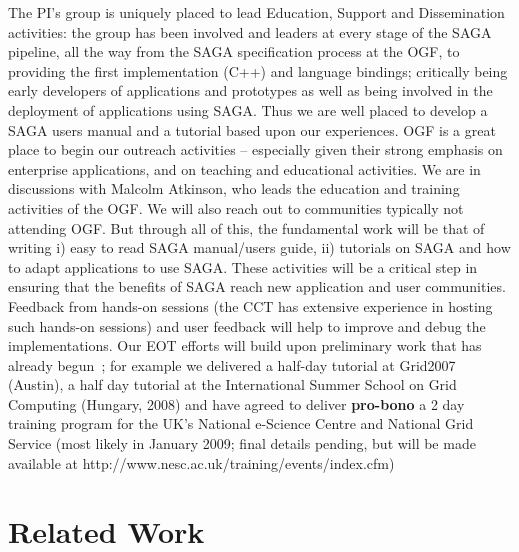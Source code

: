 \documentclass[10pt,letterpaper]{article}
\begin{document}
The PI's group is uniquely placed to lead Education, Support and
Dissemination activities: the group has been involved and leaders at
every stage of the SAGA pipeline, all the way from the SAGA
specification process at the OGF, to providing the first
implementation (C++) and language bindings; critically being early
developers of applications and prototypes as well as being involved
in the deployment of applications using SAGA.  Thus we are well placed
to develop a SAGA users manual and a tutorial based upon our
experiences. OGF is a great place to begin our outreach activities --
especially given their strong emphasis on enterprise applications, and
on teaching and educational activities.  We are in discussions with
Malcolm Atkinson, who leads the education and training activities of
the OGF. We will also reach out to communities typically not attending
OGF.  But through all of this, the fundamental work will be that of
writing i) easy to read SAGA manual/users guide, ii) tutorials on
SAGA and how to adapt applications to use SAGA.  These activities will
be a critical step in ensuring that the benefits of SAGA reach new
application and user communities.  Feedback from hands-on sessions
(the CCT has extensive experience in hosting such hands-on sessions)
and user feedback will help to improve and debug the implementations.
Our EOT efforts will build upon preliminary work that has already
begun~\cite{eot_url1, eot_url2, eot_url3}; for example we delivered a
half-day tutorial at Grid2007 (Austin), a half day tutorial at the
International Summer School on Grid Computing (Hungary, 2008) and have
agreed to deliver {\bf pro-bono} a 2 day training program for the UK's
National e-Science Centre and National Grid Service (most likely in
January 2009; final details pending, but will be made available at
http://www.nesc.ac.uk/training/events/index.cfm)

\section{Related Work}
\label{subsubsection:other_saga_work}
\end{document}
